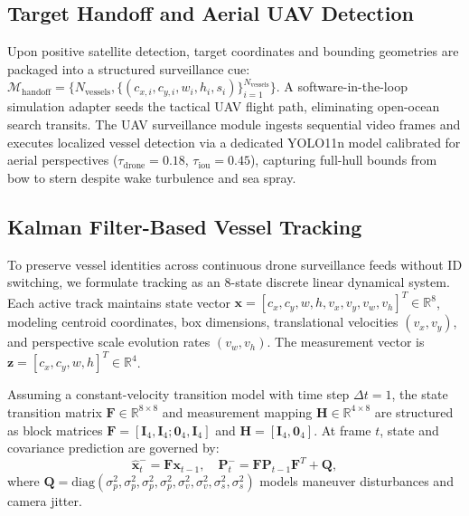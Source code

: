 \documentclass[conference]{IEEEtran}
\begin{document}
\subsection{Target Handoff and Aerial UAV Detection}
Upon positive satellite detection, target coordinates and bounding geometries are packaged into a structured surveillance cue: $\mathcal{M}_{\text{handoff}} = \{N_{\text{vessels}}, \{(c_{x,i}, c_{y,i}, w_i, h_i, s_i)\}_{i=1}^{N_{\text{vessels}}}\}$. A software-in-the-loop simulation adapter seeds the tactical UAV flight path, eliminating open-ocean search transits. The UAV surveillance module ingests sequential video frames and executes localized vessel detection via a dedicated YOLO11n model calibrated for aerial perspectives ($\tau_{\text{drone}} = 0.18$, $\tau_{\text{iou}} = 0.45$), capturing full-hull bounds from bow to stern despite wake turbulence and sea spray.

\subsection{Kalman Filter-Based Vessel Tracking}
To preserve vessel identities across continuous drone surveillance feeds without ID switching, we formulate tracking as an 8-state discrete linear dynamical system. Each active track maintains state vector $\mathbf{x} = [c_x, c_y, w, h, v_x, v_y, v_w, v_h]^T \in \mathbb{R}^8$, modeling centroid coordinates, box dimensions, translational velocities $(v_x, v_y)$, and perspective scale evolution rates $(v_w, v_h)$. The measurement vector is $\mathbf{z} = [c_x, c_y, w, h]^T \in \mathbb{R}^4$.

Assuming a constant-velocity transition model with time step $\Delta t = 1$, the state transition matrix $\mathbf{F} \in \mathbb{R}^{8\times8}$ and measurement mapping $\mathbf{H} \in \mathbb{R}^{4\times8}$ are structured as block matrices $\mathbf{F} = [\mathbf{I}_4, \mathbf{I}_4; \mathbf{0}_4, \mathbf{I}_4]$ and $\mathbf{H} = [\mathbf{I}_4, \mathbf{0}_4]$. At frame $t$, state and covariance prediction are governed by:
\begin{equation}
\hat{\mathbf{x}}_t^- = \mathbf{F} \mathbf{x}_{t-1}, \quad \mathbf{P}_t^- = \mathbf{F} \mathbf{P}_{t-1} \mathbf{F}^T + \mathbf{Q},
\label{eq:kalman_pred}
\end{equation}
where $\mathbf{Q} = \text{diag}(\sigma_{p}^2, \sigma_{p}^2, \sigma_{p}^2, \sigma_{p}^2, \sigma_{v}^2, \sigma_{v}^2, \sigma_{s}^2, \sigma_{s}^2)$ models maneuver disturbances and camera jitter.
\end{document}
